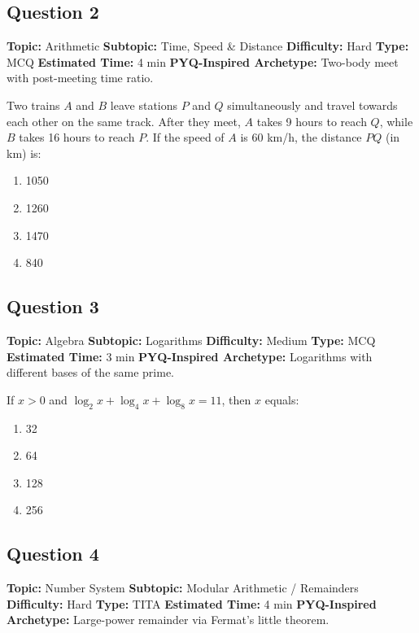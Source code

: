 \documentclass[11pt]{article}
\begin{document}
\subsection*{Question 2}
\textbf{Topic:} Arithmetic \quad
\textbf{Subtopic:} Time, Speed \& Distance \quad
\textbf{Difficulty:} Hard \quad
\textbf{Type:} MCQ \quad
\textbf{Estimated Time:} 4 min \quad
\textbf{PYQ-Inspired Archetype:} Two-body meet with post-meeting time ratio.

\begin{tcolorbox}
Two trains \(A\) and \(B\) leave stations \(P\) and \(Q\) simultaneously and travel towards each other on the same track. After they meet, \(A\) takes 9 hours to reach \(Q\), while \(B\) takes 16 hours to reach \(P\). If the speed of \(A\) is 60 km/h, the distance \(PQ\) (in km) is:
\end{tcolorbox}

\begin{enumerate}[label=(\Alph*)]
\item 1050
\item 1260
\item 1470
\item 840
\end{enumerate}

\subsection*{Question 3}
\textbf{Topic:} Algebra \quad
\textbf{Subtopic:} Logarithms \quad
\textbf{Difficulty:} Medium \quad
\textbf{Type:} MCQ \quad
\textbf{Estimated Time:} 3 min \quad
\textbf{PYQ-Inspired Archetype:} Logarithms with different bases of the same prime.

\begin{tcolorbox}
If \(x>0\) and \(\log_{2}x + \log_{4}x + \log_{8}x = 11\), then \(x\) equals:
\end{tcolorbox}

\begin{enumerate}[label=(\Alph*)]
\item 32
\item 64
\item 128
\item 256
\end{enumerate}

\subsection*{Question 4}
\textbf{Topic:} Number System \quad
\textbf{Subtopic:} Modular Arithmetic / Remainders \quad
\textbf{Difficulty:} Hard \quad
\textbf{Type:} TITA \quad
\textbf{Estimated Time:} 4 min \quad
\textbf{PYQ-Inspired Archetype:} Large-power remainder via Fermat's little theorem.
\end{document}
